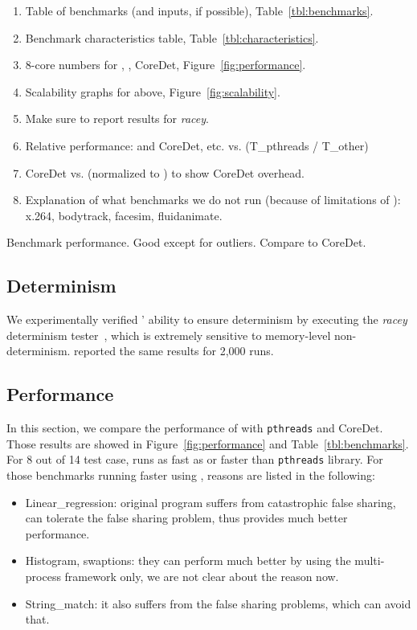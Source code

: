 \begin{enumerate}
\item Table of benchmarks (and inputs, if possible), Table~\ref{tbl:benchmarks}.
\item Benchmark characteristics table, Table~\ref{tbl:characteristics}.
\item 8-core numbers for \pthreads{}, \dthreads{}, CoreDet, Figure~\ref{fig:performance}.
\item Scalability graphs for above, Figure~\ref{fig:scalability}.
\item Make sure to report results for \emph{racey}.
\item Relative performance: \dthreads{} and CoreDet, etc. vs. \pthreads{} (T\_pthreads / T\_other)
\item CoreDet vs. \dthreads{} (normalized to \dthreads{}) to show CoreDet overhead.
\item Explanation of what benchmarks we do not run (because of limitations of \dthreads{}): x.264, bodytrack, facesim, fluidanimate.
\end{enumerate}

Benchmark performance. Good except for outliers. Compare to CoreDet.

\subsection{Determinism}
We experimentally verified \dthreads{}' ability to ensure determinism
by executing the \emph{racey} determinism tester~\cite{1508256}, which
is extremely sensitive to memory-level non-determinism. \dthreads{}
reported the same results for 2,000 runs.

\subsection{Performance}
In this section, we compare the performance of \dthreads{} with \texttt{pthreads} and CoreDet.
Those results are showed in Figure~\ref{fig:performance} and Table~\ref{tbl:benchmarks}.
For 8 out of 14 test case, \dthreads{} runs as fast as or faster than \texttt{pthreads} library.
For those benchmarks running faster using \dthreads{}, reasons are listed in the following:
\begin{itemize}
\item Linear\_regression: original program suffers from catastrophic false sharing, \dthreads{} can tolerate the false 
sharing problem, thus provides much better performance. 
\item Histogram, swaptions: they can perform much better by using the multi-process framework only, we are not clear about the reason now. 
\item String\_match: it also suffers from the false sharing problems, which \dthreads{} can avoid that.
\end{itemize}

